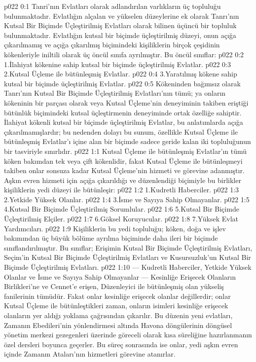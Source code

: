 \vs p022 0:1 Tanri’nın Evlatları olarak adlandırılan varlıkların üç topluluğu bulunmaktadır. Evlatlığın alçalan ve yükselen düzeylerine ek olarak Tanrı’nın Kutsal Bir Biçimde Üçleştirilmiş Evlatları olarak bilinen üçüncü bir topluluk bulunmaktadır. Evlatlığın kutsal bir biçimde üçleştirilmiş düzeyi, onun açığa çıkarılmamış ve açığa çıkarılmış biçimindeki kişiliklerin birçok çeşidinin kökenleriyle iniltili olarak üç öncül sınıfa ayrılmıştır. Bu öncül sınıflar:
\vs p022 0:2 1.\bibnobreakspace İlahiyat kökenine sahip kutsal bir biçimde üçleştirilmiş Evlatlar.
\vs p022 0:3 2.\bibnobreakspace Kutsal Üçleme ile bütünleşmiş Evlatlar.
\vs p022 0:4 3.\bibnobreakspace Yaratılmış kökene sahip kutsal bir biçimde üçleştirilmiş Evlatlar.
\vs p022 0:5 Kökeninden bağımsız olarak Tanrı’nın Kutsal Bir Biçimde Üçleştirilmiş Evlatları’nın tümü; ya onların kökeninin bir parçası olarak veya Kutsal Üçleme’nin deneyiminin takiben eriştiği bütünlük biçimindeki kutsal üçleştirmenin deneyiminde ortak özelliğe sahiptir. İlahiyat kökenli kutsal bir biçimde üçleştirilmiş Evlatlar, bu anlatımlarda açığa çıkarılmamışlardır; bu nedenden dolayı bu sunum, özellikle Kutsal Üçleme ile bütünleşmiş Evlatlar’ı içine alan bir biçimde sadece geride kalan iki topluluğunun bir tasviriyle sınırlıdır.
\vs p022 1:1 Kutsal Üçleme ile bütünleşmiş Evlatlar’ın tümü köken bakımdan tek veya çift kökenlidir, fakat Kutsal Üçleme ile bütünleşmeyi takiben onlar sonsuza kadar Kutsal Üçleme’nin hizmeti ve görevine adanmıştır. Aşkın evren hizmeti için açığa çıkarıldığı ve düzenlendiği biçimiyle bu birlikler kişiliklerin yedi düzeyi ile bütünleşir:
\vs p022 1:2 1.\bibnobreakspace Kudretli Haberciler.
\vs p022 1:3 2.\bibnobreakspace Yetkide Yüksek Olanlar.
\vs p022 1:4 3.\bibnobreakspace İsme ve Sayıya Sahip Olmayanlar.
\vs p022 1:5 4.\bibnobreakspace Kutsal Bir Biçimde Üçleştirilmiş Sorumlular.
\vs p022 1:6 5.\bibnobreakspace Kutsal Bir Biçimde Üçleştirilmiş Elçiler.
\vs p022 1:7 6.\bibnobreakspace Göksel Koruyucular.
\vs p022 1:8 7.\bibnobreakspace Yüksek Evlat Yardımcıları.
\vs p022 1:9 Kişiliklerin bu yedi topluluğu; köken, doğa ve işlev bakımından üç büyük bölüme ayrılma biçiminde daha ileri bir biçimde sınıflandırılmıştır. Bu sınıflar; Erişimin Kutsal Bir Biçimde Üçleştirilmiş Evlatları, Seçim’in Kutsal Bir Biçimde Üçleştirilmiş Evlatları ve Kusursuzluk’un Kutsal Bir Biçimde Üçleştirilmiş Evlatları.
\vs p022 1:10  --- Kudretli Haberciler, Yetkide Yüksek Olanlar ve İsme ve Sayıya Sahip Olmayanlar --- Kesinliğe Erişecek Olanların Birlikleri’ne ve Cennet’e erişen, Düzenleyici ile bütünleşmiş olan yükseliş fanilerinin tümüdür. Fakat onlar kesinliğe erişecek olanlar değillerdir; onlar Kutsal Üçleme ile bütünleştikleri zaman, onların isimleri kesinliğe erişecek olanların yer aldığı yoklama çağrısından çıkarılır. Bu düzenin yeni evlatları, Zamanın Ebedileri’nin yönlendirmesi altında Havona döngülerinin döngüsel yönetim merkezi gezegenleri üzerinde göreceli olarak kısa süreliğine hazırlanmanın özel dersleri boyunca geçerler. Bu süreç sonrasında ise onlar, yedi aşkın evren içinde Zamanın Ataları’nın hizmetleri görevine atanırlar.
